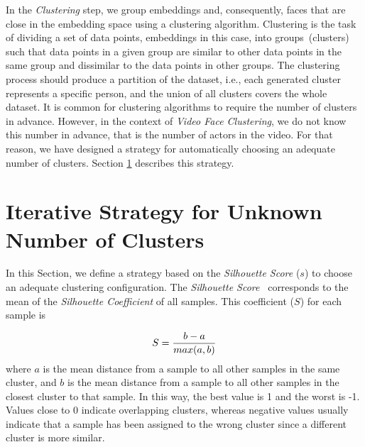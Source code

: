 In the \textit{Clustering} step, we group embeddings and, consequently, faces that are close in the embedding space using a clustering algorithm. 
Clustering is the task of dividing a set of data points, embeddings in this case, into groups~(clusters) such that data points in a given group are similar to other data points in the same group and dissimilar to the data points in other groups.
The clustering process should produce a partition of the dataset, i.e., each generated cluster represents a specific person, and the union of all clusters covers the whole dataset. 
It is common for clustering algorithms to require the number of clusters in advance.
However, in the context of \emph{Video Face Clustering}, we do not know this number in advance, that is the number of actors in the video. 
For that reason, we have designed a strategy for automatically choosing an adequate number of clusters.
Section \ref{subsec:unknown_nclusters} describes this strategy.

\section{Iterative Strategy for Unknown Number of Clusters}
\label{subsec:unknown_nclusters}

In this Section, we define a strategy based on the \emph{Silhouette Score} ($s$) \cite{rousseeuw1987silhouettes} to choose an adequate clustering configuration.
The \emph{Silhouette Score}~\cite{rousseeuw1987silhouettes} corresponds to the mean of the \emph{Silhouette Coefficient} of all samples.
This coefficient ($S$) for each sample is 

\begin{equation}
\label{equation:Silh}
    S = \frac{b-a}{max(a,b)} 
\vspace{1em}
\end{equation}
where $a$ is the mean distance from a sample to all other samples in the same cluster, and $b$ is the mean distance from a sample to all other samples in the closest cluster to that sample.
In this way, the best value is 1 and the worst is -1. Values close to 0 indicate overlapping clusters, whereas negative values usually indicate that a sample has been assigned to the wrong cluster since a different cluster is more similar.

